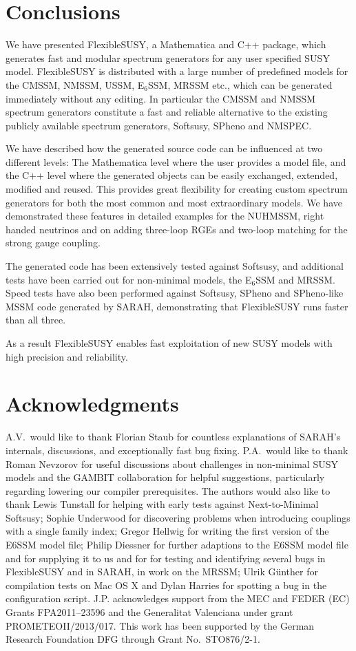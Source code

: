 \documentclass[final,3p,11pt,pdflatex]{elsarticle}
\makeatletter
\newcommand{\fs}{FlexibleSUSY\@\xspace}
\newcommand{\mathematica}{Mathematica\xspace}
\newcommand{\ESSM}{E$_6$SSM\@\xspace}
\makeatother
\begin{document}
\section{Conclusions}

We have presented \fs, a Mathematica and C++ package, which generates fast and
modular spectrum generators for any user specified SUSY model.  \fs is
distributed with a large number of predefined models for the CMSSM,
NMSSM, USSM, \ESSM, MRSSM etc., which can be generated immediately
without any editing.  In particular the CMSSM and NMSSM spectrum
generators constitute a fast and reliable alternative to the existing
publicly available spectrum generators, Softsusy, SPheno and
NMSPEC. 

We have described how the generated source code can be influenced at
two different levels: The \mathematica level where the user provides a
model file, and the C++ level where the generated objects can be
easily exchanged, extended, modified and reused.  This provides great
flexibility for creating custom spectrum generators for both the most
common and most extraordinary models.  We have demonstrated these
features in detailed examples for the NUHMSSM, right handed neutrinos
and on adding three-loop RGEs and two-loop matching for the strong
gauge coupling.  

The generated code has been extensively tested against Softsusy, and
additional tests have been carried out for non-minimal models, the
\ESSM and MRSSM.  Speed tests have also been performed against
Softsusy, SPheno and SPheno-like MSSM code generated by SARAH,
demonstrating that \fs runs faster than all three.

As a result \fs enables fast exploitation of new SUSY models with high
precision and reliability.

\section*{Acknowledgments}

A.V.\ would like to thank Florian Staub for countless explanations of
SARAH's internals, discussions, and exceptionally fast bug
fixing. P.A.~would like to thank Roman Nevzorov for useful discussions
about challenges in non-minimal SUSY models and the GAMBIT
collaboration for helpful suggestions, particularly regarding
lowering our compiler prerequisites. The authors would also like to
thank Lewis Tunstall for helping with early tests against
Next-to-Minimal Softsusy; Sophie Underwood for discovering problems
when introducing couplings with a single family index; Gregor Hellwig
for writing the first version of the E6SSM model file; Philip Diessner
for further adaptions to the E6SSM model file and for supplying it to
us and for for testing and identifying several bugs in \fs and in
SARAH, in work on the MRSSM; Ulrik Günther for compilation tests on
Mac OS X and Dylan Harries for spotting a bug in the configuration
script.
%
J.P. acknowledges support from the MEC and FEDER (EC) Grants
FPA2011--23596 and the Generalitat Valenciana under grant PROMETEOII/2013/017.
This work has been supported by the German Research Foundation DFG
through Grant No.~STO876/2-1.
\end{document}
